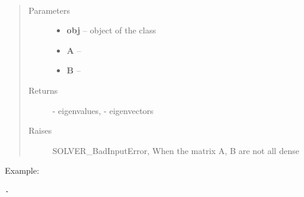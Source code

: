 \documentclass[letterpaper,10pt,english]{sphinxmanual}
\begin{document}
\begin{fulllineitems}
\label{index:brake.solve.solver.gev_dense}~\begin{quote}\begin{description}
\item[{Parameters}] \leavevmode\begin{itemize}
\item {} 
\textbf{obj} -- object of the class 

\item {} 
\textbf{A} -- 

\item {} 
\textbf{B} -- 

\end{itemize}

\item[{Returns}] \leavevmode
{} - eigenvalues,  - eigenvectors

\item[{Raises }] \leavevmode
SOLVER\_BadInputError, When the matrix A, B are not all dense

\end{description}\end{quote}

Example:

\begin{Verbatim}[commandchars=\\\{\}]
.
\end{Verbatim}

\end{fulllineitems}

\end{document}
